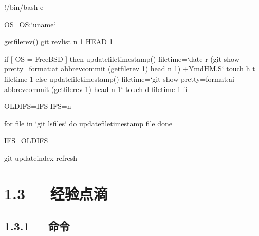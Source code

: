 \documentclass[letterpaper,12pt,english]{sphinxmanual}
\begin{document}
\begin{sphinxVerbatim}[commandchars=\\\{\}]
\PYGZsh{}!/bin/bash \PYGZhy{}e

OS=\PYGZdl{}\PYGZob{}OS:\PYGZhy{}{}`uname{}`\PYGZcb{}

get\PYGZus{}file\PYGZus{}rev() \PYGZob{}
    git rev\PYGZhy{}list \PYGZhy{}n 1 HEAD \PYGZdq{}\PYGZdl{}1\PYGZdq{}
\PYGZcb{}

if [ \PYGZdq{}\PYGZdl{}OS\PYGZdq{} = \PYGZsq{}FreeBSD\PYGZsq{} ]
then
    update\PYGZus{}file\PYGZus{}timestamp() \PYGZob{}
        file\PYGZus{}time={}`date \PYGZhy{}r \PYGZdq{}\PYGZdl{}(git show \PYGZhy{}\PYGZhy{}pretty=format:\PYGZpc{}at   \PYGZhy{}\PYGZhy{}abbrev\PYGZhy{}commit \PYGZdq{}\PYGZdl{}(get\PYGZus{}file\PYGZus{}rev \PYGZdq{}\PYGZdl{}1\PYGZdq{})\PYGZdq{} \textbar{} head \PYGZhy{}n 1)\PYGZdq{}   \PYGZsq{}+\PYGZpc{}Y\PYGZpc{}m\PYGZpc{}d\PYGZpc{}H\PYGZpc{}M.\PYGZpc{}S\PYGZsq{}{}`
        touch \PYGZhy{}h \PYGZhy{}t \PYGZdq{}\PYGZdl{}file\PYGZus{}time\PYGZdq{} \PYGZdq{}\PYGZdl{}1\PYGZdq{}
    \PYGZcb{}
else
    update\PYGZus{}file\PYGZus{}timestamp() \PYGZob{}
        file\PYGZus{}time={}`git show \PYGZhy{}\PYGZhy{}pretty=format:\PYGZpc{}ai \PYGZhy{}\PYGZhy{}abbrev\PYGZhy{}commit   \PYGZdq{}\PYGZdl{}(get\PYGZus{}file\PYGZus{}rev \PYGZdq{}\PYGZdl{}1\PYGZdq{})\PYGZdq{} \textbar{} head \PYGZhy{}n 1{}`
        touch \PYGZhy{}d \PYGZdq{}\PYGZdl{}file\PYGZus{}time\PYGZdq{} \PYGZdq{}\PYGZdl{}1\PYGZdq{}
    \PYGZcb{}
fi

OLD\PYGZus{}IFS=\PYGZdl{}IFS
IFS=\PYGZdl{}\PYGZsq{}\PYGZbs{}n\PYGZsq{}

for file in {}`git ls\PYGZhy{}files{}`
do
    update\PYGZus{}file\PYGZus{}timestamp \PYGZdq{}\PYGZdl{}file\PYGZdq{}
done

IFS=\PYGZdl{}OLD\PYGZus{}IFS

git update\PYGZhy{}index \PYGZhy{}\PYGZhy{}refresh
\end{sphinxVerbatim}


\section{1.3   经验点滴}
\label{\detokenize{001software/001install/001._u7f51_u7ad9/github:id4}}

\subsection{1.3.1   命令}
\label{\detokenize{001software/001install/001._u7f51_u7ad9/github:id5}}
\end{document}
